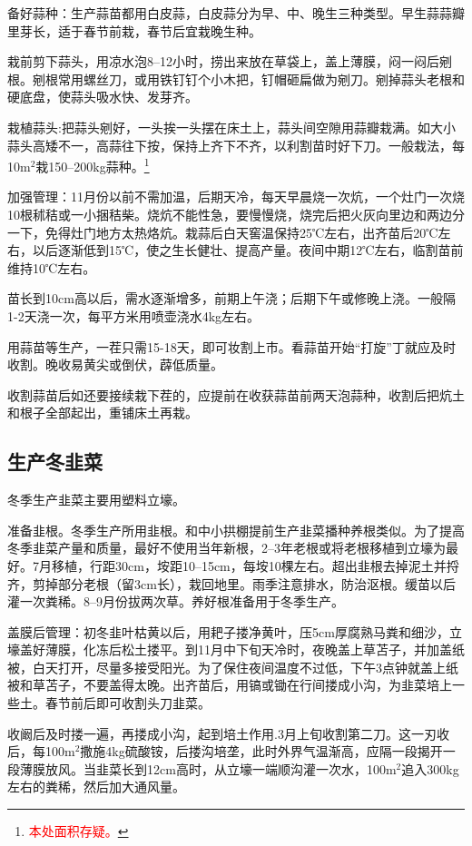 \documentclass{ctexbook}
\begin{document}
备好蒜种：生产蒜苗都用白皮蒜，白皮蒜分为早、中、晚生三种类型。早生蒜蒜瓣里芽长，适于春节前栽，春节后宜栽晚生种。

栽前剪下蒜头，用凉水泡8--12小时，捞出来放在草袋上，盖上薄膜，闷一闷后剜根。剜根常用螺丝刀，或用铁钉钉个小木把，钉帽砸扁做为剜刀。剜掉蒜头老根和硬底盘，使蒜头吸水快、发芽齐。

栽植蒜头:把蒜头剜好，一头挨一头摆在床土上，蒜头间空隙用蒜瓣栽满。如大小蒜头高矮不一，高蒜往下按，保持上齐下不齐，以利割苗时好下刀。一般栽法，每10m$^2$栽150--200kg蒜种。\footnote{\textcolor{red}{本处面积存疑。}}

加强管理：11月份以前不需加温，后期天冷，每天早晨烧一次炕，一个灶门一次烧10根秫秸或一小捆秸柴。烧炕不能性急，要慢慢烧，烧完后把火灰向里边和两边分一下，免得灶门地方太热烙炕。栽蒜后白天窖温保持25℃左右，出齐苗后20℃左右，以后逐渐低到15℃，使之生长健壮、提高产量。夜间中期12℃左右，临割苗前维持10℃左右。

苗长到10cm高以后，需水逐渐增多，前期上午浇；后期下午或修晚上浇。一般隔1-2天浇一次，每平方米用喷壶浇水4kg左右。

用蒜苗等生产，一茬只需15-18天，即可妆割上市。看蒜苗开始“打旋”丁就应及时收割。晚收易黄尖或倒伏，薜低质量。

收割蒜苗后如还要接续栽下茬的，应提前在收获蒜苗前两天泡蒜种，收割后把炕土和根子全部起出，重铺床土再栽。
\subsection{生产冬韭菜}
冬季生产韭菜主要用塑料立壕。

准备韭根。冬季生产所用韭根。和中小拱棚提前生产韭菜播种养根类似。为了提高冬季韭菜产量和质量，最好不使用当年新根，2--3年老根或将老根移植到立壕为最好。7月移植，行距30cm，垵距10--15cm，每垵10棵左右。超出韭根去掉泥土并捋齐，剪掉部分老根（留3cm长），栽回地里。雨季注意排水，防治沤根。缓苗以后灌一次粪稀。8--9月份拔两次草。养好根准备用于冬季生产。

盖膜后管理：初冬韭叶枯黄以后，用耙子搂净黄叶，压5cm厚腐熟马粪和细沙，立壕盖好薄膜，化冻后松土搂平。到11月中下旬天冷时，夜晚盖上草苫子，并加盖纸被，白天打开，尽量多接受阳光。为了保住夜间温度不过低，下午3点钟就盖上纸被和草苫子，不要盖得太晚。出齐苗后，用镐或锄在行间搂成小沟，为韭菜培上一些土。春节前后即可收割头刀韭菜。

收阚后及时搂一遍，再搂成小沟，起到培土作用.3月上旬收割第二刀。这一刃收后，每100m$^2$撒施4kg硫酸铵，后搂沟培垄，此时外界气温渐高，应隔一段揭开一段薄膜放风。当韭菜长到12cm高时，从立壕一端顺沟灌一次水，100m$^2$追入300kg左右的粪稀，然后加大通风量。
\end{document}
